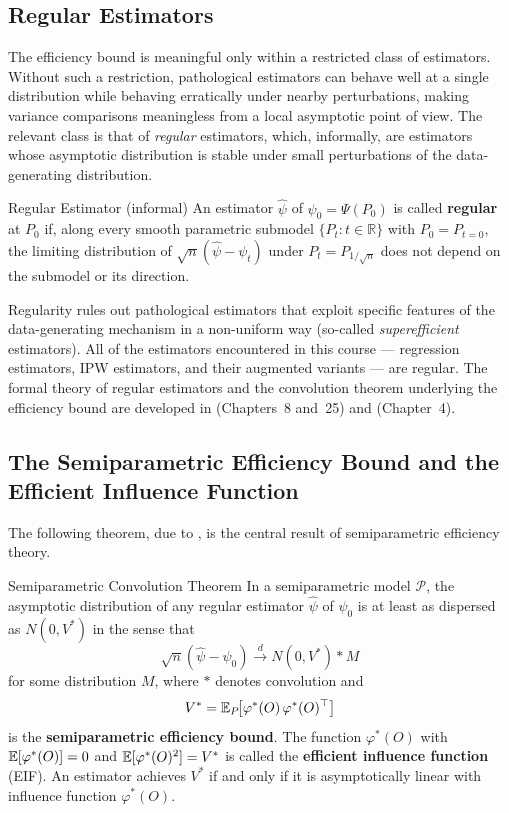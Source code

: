 \documentclass[master.tex]{subfiles}
\begin{document}
\subsection{Regular Estimators}
\label{w9:subsec:regular}

The efficiency bound is meaningful only within a restricted class of
estimators.  Without such a restriction, pathological estimators can
behave well at a single distribution while behaving erratically under
nearby perturbations, making variance comparisons meaningless from a
local asymptotic point of view.  The relevant class is that of
\emph{regular} estimators, which, informally, are estimators whose
asymptotic distribution is stable under small perturbations of the
data-generating distribution.

\begin{defn}{Regular Estimator (informal)}
\label{w9:defn:regular}
An estimator $\hat\psi$ of $\psi_0 = \Psi(P_0)$ is called
\textbf{regular} at $P_0$ if, along every smooth parametric submodel
$\{P_t : t \in \mathbb{R}\}$ with $P_0 = P_{t=0}$, the limiting
distribution of $\sqrt{n}(\hat\psi - \psi_t)$ under $P_t = P_{1/\sqrt{n}}$
does not depend on the submodel or its direction.
\end{defn}

Regularity rules out pathological estimators that exploit specific
features of the data-generating mechanism in a non-uniform way
(so-called \emph{superefficient} estimators).  All of the estimators
encountered in this course --- regression estimators, IPW estimators,
and their augmented variants --- are regular.  The formal theory of
regular estimators and the convolution theorem underlying the
efficiency bound are developed in \citet{vandervaart1998}
(Chapters~8 and~25) and \citet{tsiatis2006semiparametric} (Chapter~4).

\subsection{The Semiparametric Efficiency Bound and the Efficient Influence Function}
\label{w9:subsec:eif}

The following theorem, due to \citet{bickel1993}, is the central result
of semiparametric efficiency theory.

\begin{thm}{Semiparametric Convolution Theorem}
\label{w9:thm:convolution}
In a semiparametric model $\mathcal{P}$, the asymptotic distribution of
any regular estimator $\hat\psi$ of $\psi_0$ is at least as dispersed
as $N(0, V^*)$ in the sense that
\[
  \sqrt{n}(\hat\psi - \psi_0) \overset{d}{\longrightarrow}
  N(0, V^*) * M
\]
for some distribution $M$, where $*$ denotes convolution and
\[
  V^* = \mathbb{E}_P\!\bigl[\varphi^*(O)\,\varphi^*(O)^\top\bigr]
\]
is the \textbf{semiparametric efficiency bound}.  The function
$\varphi^*(O)$ with $\mathbb{E}[\varphi^*(O)] = 0$ and $\mathbb{E}[\varphi^*(O)^2] =
V^*$ is called the \textbf{efficient influence function} (EIF).  An
estimator achieves $V^*$ if and only if it is asymptotically linear
with influence function $\varphi^*(O)$.
\end{thm}
\end{document}
